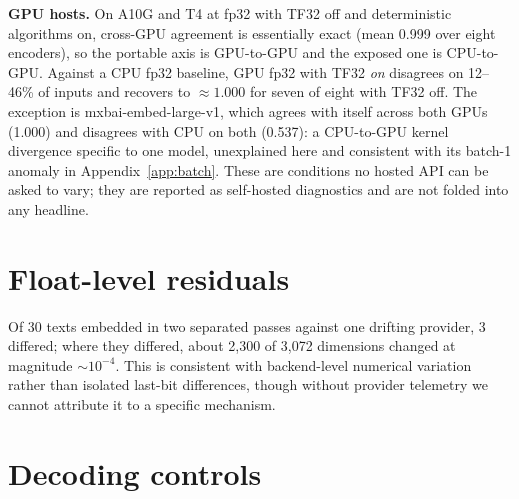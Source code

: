 \documentclass{article}
\begin{document}
\textbf{GPU hosts.} On A10G and T4 at fp32 with TF32 off and deterministic algorithms on, cross-GPU agreement is essentially exact (mean 0.999 over eight encoders), so the portable axis is GPU-to-GPU and the exposed one is CPU-to-GPU. Against a CPU fp32 baseline, GPU fp32 with TF32 \emph{on} disagrees on 12--46\% of inputs and recovers to $\approx1.000$ for seven of eight with TF32 off. The exception is mxbai-embed-large-v1, which agrees with itself across both GPUs (1.000) and disagrees with CPU on both (0.537): a CPU-to-GPU kernel divergence specific to one model, unexplained here and consistent with its batch-1 anomaly in Appendix~\ref{app:batch}. These are conditions no hosted API can be asked to vary; they are reported as self-hosted diagnostics and are not folded into any headline.

\section{Float-level residuals}\label{app:resid}

Of 30 texts embedded in two separated passes against one drifting provider, 3 differed; where they differed, about 2{,}300 of 3{,}072 dimensions changed at magnitude ${\sim}10^{-4}$. This is consistent with backend-level numerical variation rather than isolated last-bit differences, though without provider telemetry we cannot attribute it to a specific mechanism.

\section{Decoding controls}\label{app:deccontrol}
\end{document}
